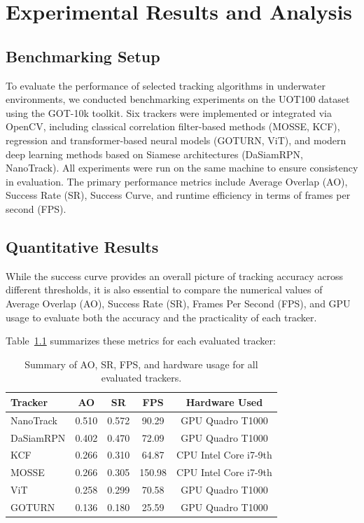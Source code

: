 \chapter{Experimental Results and Analysis}

\section{Benchmarking Setup}

To evaluate the performance of selected tracking algorithms in underwater environments, we conducted benchmarking experiments on the UOT100 dataset using the GOT-10k toolkit. Six trackers were implemented or integrated via OpenCV, including classical correlation filter-based methods (MOSSE, KCF), regression and transformer-based neural models (GOTURN, ViT), and modern deep learning methods based on Siamese architectures (DaSiamRPN, NanoTrack). All experiments were run on the same machine to ensure consistency in evaluation. The primary performance metrics include Average Overlap (AO), Success Rate (SR), Success Curve, and runtime efficiency in terms of frames per second (FPS).


\section{Quantitative Results}

While the success curve provides an overall picture of tracking accuracy across different thresholds, it is also essential to compare the numerical values of Average Overlap (AO), Success Rate (SR), Frames Per Second (FPS), and GPU usage to evaluate both the accuracy and the practicality of each tracker.

Table~\ref{tab:ao_sr_fps_gpu_summary} summarizes these metrics for each evaluated tracker:
\begin{table}[ht]
    \centering
    \begin{tabular}{lcccc}
        \toprule
        \textbf{Tracker} & \textbf{AO} & \textbf{SR} & \textbf{FPS} & \textbf{Hardware Used} \\
        \midrule
        NanoTrack & 0.510 & 0.572 & 90.29 & GPU Quadro T1000 \\
        DaSiamRPN & 0.402 & 0.470 & 72.09 & GPU Quadro T1000 \\
        KCF & 0.266 & 0.310 & 64.87 & CPU Intel Core i7-9th \\
        MOSSE & 0.266 & 0.305 & 150.98 & CPU Intel Core i7-9th \\
        ViT & 0.258 & 0.299 & 70.58 & GPU Quadro T1000 \\
        GOTURN & 0.136 & 0.180 & 25.59 & GPU Quadro T1000 \\
        \bottomrule
    \end{tabular}
    \caption{Summary of AO, SR, FPS, and hardware usage for all evaluated trackers.}
    \label{tab:ao_sr_fps_gpu_summary}
\end{table}

